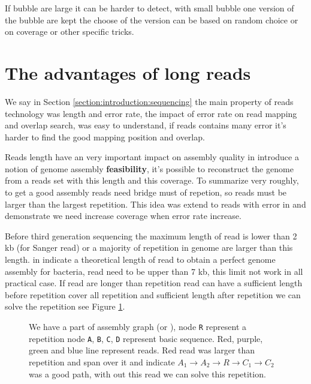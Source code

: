 \documentclass[main]{subfiles}
\begin{document}
If bubble are large it can be harder to detect, with small bubble one version of the bubble are kept the choose of the version can be based on random choice or on coverage or other specific tricks.

\section{The advantages of long reads}

We say in Section \ref{section:introduction:sequencing} the main property of reads technology was length and error rate, the impact of error rate on read mapping and overlap search, was easy to understand, if reads contains many error it's harder to find the good mapping position and overlap.

Reads length have an very important impact on assembly quality \citeauthor{Bresler_Tse} in \cite{Bresler_Tse} introduce a notion of genome assembly \textbf{feasibility}, it's possible to reconstruct the genome from a reads set with this length and this coverage. To summarize very roughly, to get a good assembly reads need bridge must of repetion, so reads must be larger than the largest repetition. This idea was extend to reads with error in \cite{feasibility_with_error} and demonstrate we need increase coverage when error rate increase.

Before third generation sequencing the maximum length of read is lower than 2 kb (for Sanger read) or a majority of repetition in genome are larger than this length. \citeauthor{one_chromosome_one_contig} in \cite{one_chromosome_one_contig} indicate a theoretical length of read to obtain a perfect genome assembly for bacteria, read need to be upper than 7 kb, this limit not work in all practical case. If read are longer than repetition read can have a sufficient length before repetition cover all repetition and sufficient length after repetition we can solve the repetition see Figure \ref{intro:fig:whylongreads}.

\begin{figure}[ht]
    \centering
    
    \caption{We have a part of assembly graph (\OLC or \DBG), node \texttt{R} represent a repetition node \texttt{A}, \texttt{B}, \texttt{C}, \texttt{D} represent basic sequence. Red, purple, green and blue line represent reads. Red read was larger than repetition and span over it and indicate $A_1 \rightarrow A_2 \rightarrow R \rightarrow C_1 \rightarrow C_2$ was a good path, with out this read we can solve this repetition.}
    \label{intro:fig:whylongreads}
\end{figure}
\end{document}
